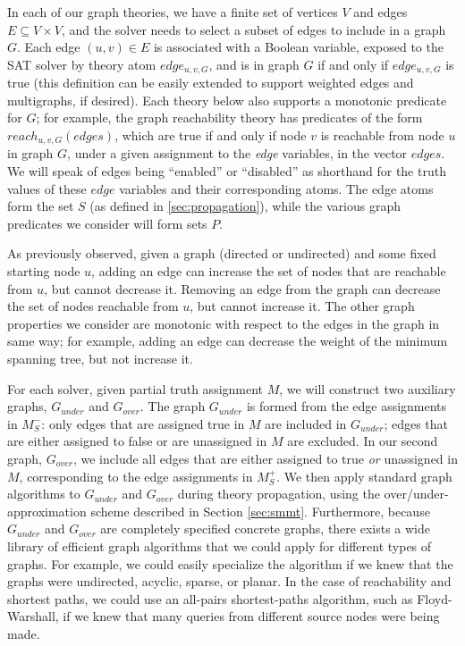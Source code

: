 \documentclass[runningheads]{llncs}
\newcommand{\gunder}{G_{under}}
\newcommand{\gover}{G_{over}}
\begin{document}
In each of our graph theories, we have a finite set of vertices $V$
and edges $E \subseteq V \times V$,
and the solver needs to select a subset of edges to include in a graph $G$.
Each edge $(u,v) \in E$ is associated with a Boolean variable, exposed to the SAT solver by theory
atom $edge_{u,v,G}$, and is in graph $G$ if and only if
$edge_{u,v,G}$ is true (this definition can be easily extended to
support weighted edges and multigraphs, if desired). Each theory below
also supports a monotonic predicate for $G$; for example, the graph
reachability theory has predicates of the form $reach_{u,v,G}(edges)$, which are
true if and only if node $v$ is reachable from node $u$ in graph $G$,
under a given assignment to the \textit{edge} variables, in the vector $edges$. We will speak of
edges being ``enabled'' or ``disabled'' as shorthand for the truth values of
these $edge$ variables and their corresponding atoms. The edge atoms form the set $S$ (as defined in \autoref{sec:propagation}), while the various graph predicates we consider will form sets $P$.

As previously observed, given a graph (directed or undirected) and some fixed starting node $u$, adding an edge can increase the set of nodes that are reachable from $u$, but cannot decrease it.  Removing an edge from the graph can decrease the set of nodes reachable from $u$, but cannot increase it. The other graph properties we consider are monotonic with respect to the edges in the graph in same way; for example, adding an edge can decrease the weight of the minimum spanning tree, but not increase it. 

For each solver, given partial truth assignment $M$, we will construct two
auxiliary graphs, $\gunder$ and $\gover$. The graph $\gunder$ is formed
from the edge assignments in $M_S^-$: only edges that are assigned true in
$M$ are included in $\gunder$; edges that are either assigned to false
or are unassigned in $M$ are excluded. In our second graph, $\gover$, we
include all edges that are either assigned to true \textit{or} unassigned
in $M$, corresponding to the edge assignments in $M_S^+$. We then
apply standard graph algorithms
to $\gunder$ and $\gover$ during theory propagation, using the
over/under-approximation scheme described in Section \ref{sec:smmt}.
Furthermore, because $\gunder$ and $\gover$ are completely specified
concrete graphs,
there exists a wide library of efficient graph algorithms that we could
apply for different types of graphs.
For example, we could
easily specialize the algorithm if we knew that the graphs were
undirected, acyclic, sparse, or planar. In the case of reachability
and shortest paths, we could use an all-pairs shortest-paths algorithm,
such as Floyd-Warshall, if we knew that many queries from different
source nodes were being made.
\end{document}
